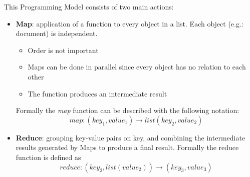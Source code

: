 \documentclass[a4paper,11pt, twoside]{article}
\begin{document}
		\bigskip


		\noindent
		This Programming Model consists of two main actions:
		\begin{itemize}
			\item \textbf{Map}: application of a function to every object in a list. Each object (e.g.: document) is independent.
			\begin{itemize}
				\item Order is not important
				\item Maps can be done in parallel since every object has no relation to each other
				\item The function produces an intermediate result
			\end{itemize}
			
			Formally the \textit{map} function can be described with the following notation: \[ map:(key_1, value_1) \to list(key_2, value_2) \]
			\item \textbf{Reduce}: grouping key-value pairs on key, and combining the intermediate results generated by Maps to produce a final result. Formally the reduce function is defined as \[ reduce:(key_2, list(value_2)) \to (key_3, value_3)  \]
		\end{itemize}
\end{document}
